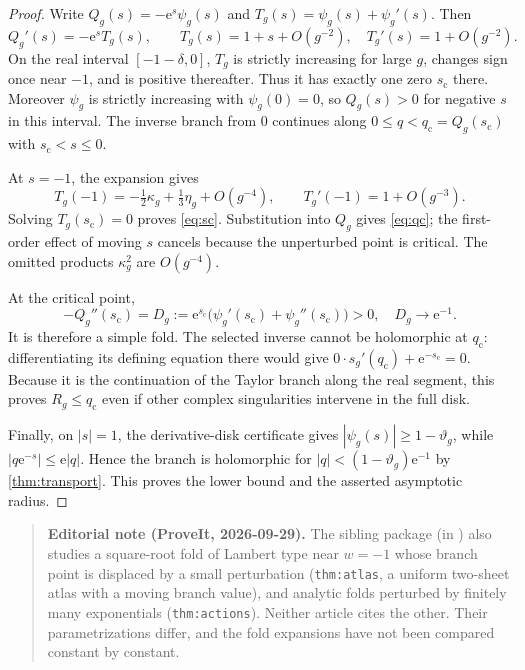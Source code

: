 \documentclass[11pt,a4paper]{article}
\numberwithin{equation}{section}
\theoremstyle{definition}
\theoremstyle{remark}
\newcommand{\e}{\mathrm e}
\begin{document}
\begin{proof}
Write $Q_g(s)=-\e^s\psi_g(s)$ and
$T_g(s)=\psi_g(s)+\psi_g'(s)$. Then
\[
 Q_g'(s)=-\e^s T_g(s),\qquad
 T_g(s)=1+s+O(g^{-2}),\quad T_g'(s)=1+O(g^{-2}).
\]
On the real interval $[-1-\delta,0]$, $T_g$ is strictly increasing for large $g$, changes sign once near $-1$, and is positive thereafter. Thus it has exactly one zero $s_{\mathrm c}$ there. Moreover $\psi_g$ is strictly increasing with $\psi_g(0)=0$, so $Q_g(s)>0$ for negative $s$ in this interval. The inverse branch from $0$ continues along $0\leq q<q_{\mathrm c}=Q_g(s_{\mathrm c})$ with $s_{\mathrm c}<s\leq0$.

At $s=-1$, the expansion gives
\[
 T_g(-1)=-\tfrac12\kappa_g+\tfrac13\eta_g+O(g^{-4}),
 \qquad T_g'(-1)=1+O(g^{-3}).
\]
Solving $T_g(s_{\mathrm c})=0$ proves \eqref{eq:sc}. Substitution into $Q_g$ gives \eqref{eq:qc}; the first-order effect of moving $s$ cancels because the unperturbed point is critical. The omitted products $\kappa_g^2$ are $O(g^{-4})$.

At the critical point,
\begin{equation}
 -Q_g''(s_{\mathrm c})=
 D_g:=\e^{s_{\mathrm c}}\big(\psi_g'(s_{\mathrm c})+
                              \psi_g''(s_{\mathrm c})\big)>0,
 \quad D_g\longrightarrow\e^{-1}.
 \label{eq:Dg}
\end{equation}
It is therefore a simple fold. The selected inverse cannot be holomorphic at $q_{\mathrm c}$: differentiating its defining equation there would give
$0\cdot s_g'(q_{\mathrm c})+\e^{-s_{\mathrm c}}=0$. Because it is the continuation of the Taylor branch along the real segment, this proves $R_g\leq q_{\mathrm c}$ even if other complex singularities intervene in the full disk.

Finally, on $|s|=1$, the derivative-disk certificate gives
$|\psi_g(s)|\geq1-\vartheta_g$, while $|q\e^{-s}|\leq\e|q|$. Hence the branch is holomorphic for $|q|<(1-\vartheta_g)\e^{-1}$ by \cref{thm:transport}. This proves the lower bound and the asserted asymptotic radius.
\end{proof}

\begin{quote}\small\textbf{Editorial note (ProveIt, 2026-09-29).} The sibling package  (in ) also studies a square-root fold of Lambert type near $w=-1$ whose branch point is displaced by a small perturbation (\texttt{thm:atlas}, a uniform two-sheet atlas with a moving branch value), and analytic folds perturbed by finitely many exponentials (\texttt{thm:actions}). Neither article cites the other. Their parametrizations differ, and the fold expansions have not been compared constant by constant.\end{quote}
\end{document}
